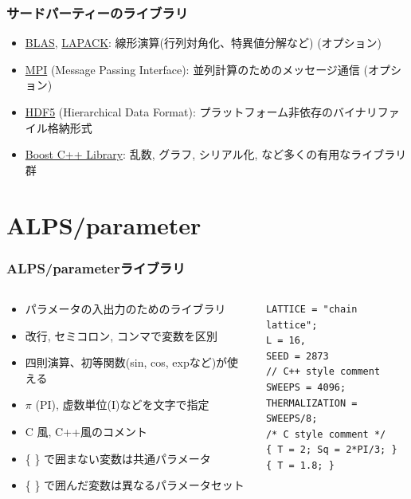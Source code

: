 \begin{frame}
  \frametitle{サードパーティーのライブラリ}
  \begin{itemize}
    \setlength{\itemsep}{1em}
  \item \href{http://www.netlib.org/blas/}{BLAS}, \href{http://www.netlib.org/lapack/}{LAPACK}: 線形演算(行列対角化、特異値分解など) (オプション)
  \item \href{http://www.mpi-forum.org/}{MPI} (Message Passing Interface): 並列計算のためのメッセージ通信 (オプション)
  \item \href{http://www.hdfgroup.org/HDF5/}{HDF5} (Hierarchical Data Format): プラットフォーム非依存のバイナリファイル格納形式
  \item \href{http://www.boost.org/}{Boost C++ Library}: 乱数, グラフ, シリアル化, など多くの有用なライブラリ群
  \end{itemize}
\end{frame}

\section{ALPS/parameter}
\begin{frame}[t,fragile]
  \frametitle{ALPS/parameterライブラリ}
  \begin{columns}[T]
    \begin{column}{.5\textwidth}
      \begin{itemize}
      \item パラメータの入出力のためのライブラリ
        \item 改行, セミコロン, コンマで変数を区別
        \item 四則演算、初等関数(sin, cos, expなど)が使える
        \item $\pi$ (PI), 虚数単位(I)などを文字で指定
          \item C 風, C++風のコメント
          \item \{ \} で囲まない変数は共通パラメータ
          \item \{ \} で囲んだ変数は異なるパラメータセット
      \end{itemize}
    \end{column}
    \begin{column}{.5\textwidth}
    \begin{lstlisting}
LATTICE = "chain lattice";
L = 16,
SEED = 2873
// C++ style comment
SWEEPS = 4096;
THERMALIZATION = SWEEPS/8;
/* C style comment */
{ T = 2; Sq = 2*PI/3; }
{ T = 1.8; }
\end{lstlisting}
    \end{column}
  \end{columns}
\end{frame}

